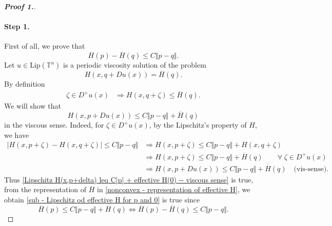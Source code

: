 \documentclass[12pt, oneside]{amsart}  	%
\begin{document}
\begin{proof}[\textbf{Proof 1.}]
\paragraph{\textbf{Step 1.}} First of all, we prove that 
\begin{equation}\label{sub - Lipschitz od effective H for p and 0}
\overline{H}(p) - \overline{H}(q) \leq C\Vert p - q\Vert.
\end{equation}
Let $u\in \text{Lip}(\mathbb{T}^n)$ is a periodic viscosity solution of the problem
\begin{equation}\label{Lipschitz E_q}
H(x,q + Du(x)) = \overline{H}(q)\tag{$E_q$}.
\end{equation}
By definition
\begin{align*}
\zeta\in D^+u(x) &\Longrightarrow H(x,q+\zeta) \leq  \overline{H}(q).
\end{align*}
We will show that
\begin{equation}\label{Lipschitz H(x,p+delta) leq C|p| + effective H(0) -- viscous sense}
H(x,p+Du(x)) \leq C\Vert p-q\Vert + \overline{H}(q)
\end{equation}
in the viscous sense. Indeed, for $\zeta\in D^+u(x)$, by the Lipschitz's property of $H$, we have
\begin{align*}
|H(x,p+\zeta) - H(x,q+\zeta)| \leq C\Vert p-q\Vert &\Longrightarrow 
H(x,p+\zeta)\leq C\Vert p-q\Vert + H(x,q+\zeta)   \\
 &\Longrightarrow H(x,p+\zeta)\leq  C\Vert p-q\Vert + \overline{H}(q) \quad\quad \forall\; \zeta\in D^+u(x)\\
 &\Longrightarrow  H(x,p+Du(x)) \leq C\Vert p-q\Vert + \overline{H}(q) \quad\text{(vis-sense)}.
\end{align*}
Thus \eqref{Lipschitz H(x,p+delta) leq C|p| + effective H(0) -- viscous sense} is true, from the representation of $\overline{H}$ in \eqref{nonconvex - representation of effective H}, we obtain \eqref{sub - Lipschitz od effective H for p and 0} is true since
\begin{equation*}
\overline{H}(p) \leq C\Vert p-q\Vert + \overline{H}(q) \Longleftrightarrow \overline{H}(p) - \overline{H}(q) \leq C\Vert p-q\Vert.
\end{equation*}
\vspace*{0.2cm}


\end{proof}
\end{document}
